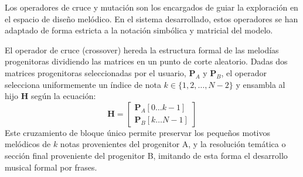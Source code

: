 Los operadores de cruce y mutación son los encargados de guiar la exploración en el espacio de diseño melódico. En el sistema desarrollado, estos operadores se han adaptado de forma estricta a la notación simbólica y matricial del modelo.

El operador de cruce (crossover) hereda la estructura formal de las melodías progenitoras dividiendo las matrices en un punto de corte aleatorio. Dadas dos matrices progenitoras seleccionadas por el usuario, $\mathbf{P}_A$ y $\mathbf{P}_B$, el operador selecciona uniformemente un índice de nota $k \in \{1, 2, \dots, N-2\}$ y ensambla al hijo $\mathbf{H}$ según la ecuación:
\begin{equation}
    \mathbf{H} = \begin{bmatrix} \mathbf{P}_A[0 \dots k-1] \\ \mathbf{P}_B[k \dots N-1] \end{bmatrix}
\end{equation}
Este cruzamiento de bloque único permite preservar los pequeños motivos melódicos de $k$ notas provenientes del progenitor A, y la resolución temática o sección final proveniente del progenitor B, imitando de esta forma el desarrollo musical formal por frases.

